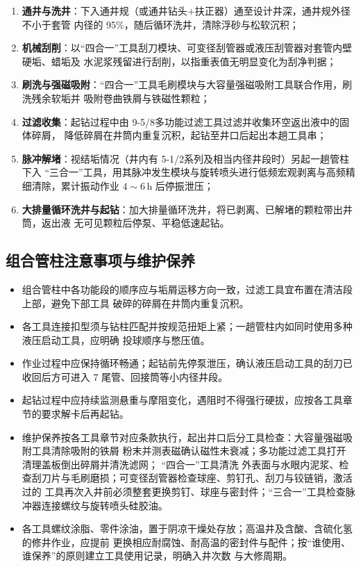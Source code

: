 \begin{enumerate}[label=(\arabic*),leftmargin=2em,itemsep=2pt]
	\item \textbf{通井与洗井}：下入通井规（或通井钻头$+$扶正器）通至设计井深，通井规外径不小于套管
	内径的 95\%，随后循环洗井，清除浮砂与松软沉积；
	\item \textbf{机械刮削}：以“四合一”工具刮刀模块、可变径刮管器或液压刮管器对套管内壁硬垢、蜡垢及
	水泥浆残留进行刮削，以指重表值无明显变化为刮净判据；
	\item \textbf{刷洗与强磁吸附}：“四合一”工具毛刷模块与大容量强磁吸附工具联合作用，刷洗残余软垢并
	吸附卷曲铁屑与铁磁性颗粒；
	\item \textbf{过滤收集}：起钻过程中由 9-5/8\inch 多功能过滤工具过滤并收集环空返出液中的固体碎屑，
	降低碎屑在井筒内重复沉积，起钻至井口后起出本趟工具串；
	\item \textbf{脉冲解堵}：视结垢情况（井内有 5-1/2\inch 系列及相当内径井段时）另起一趟管柱下入
	“三合一”工具，用其脉冲发生模块与旋转喷头进行低频宏观剥离与高频精细清除，累计振动作业
	$4\sim6$\,h 后停振泄压；
	\item \textbf{大排量循环洗井与起钻}：加大排量循环洗井，将已剥离、已解堵的颗粒带出井筒，返出液
	无可见颗粒后停泵、平稳低速起钻。
\end{enumerate}

\subsection{组合管柱注意事项与维护保养}

\begin{itemize}
	\item 组合管柱中各功能段的顺序应与垢屑运移方向一致，过滤工具宜布置在清洁段上部，避免下部工具
	破碎的碎屑在井筒内重复沉积。
	\item 各工具连接扣型须与钻柱匹配并按规范扭矩上紧；一趟管柱内如同时使用多种液压启动工具，应明确
	投球顺序与憋压值。
	\item 作业过程中应保持循环畅通；起钻前先停泵泄压，确认液压启动工具的刮刀已收回后方可进入 7\inch
	尾管、回接筒等小内径井段。
	\item 起钻过程中应持续监测悬重与摩阻变化，遇阻时不得强行硬拔，应按各工具章节的要求解卡后再起钻。
	\item 维护保养按各工具章节对应条款执行，起出井口后分工具检查：大容量强磁吸附工具清除吸附的铁屑
	粉末并测表磁确认磁性未衰减；多功能过滤工具打开清理盖板倒出碎屑并清洗滤网； “四合一”工具清洗
	外表面与水眼内泥浆、检查刮刀片与毛刷磨损；可变径刮管器检查球座、剪钉孔、刮刀与铰链销，激活过的
	工具再次入井前必须整套更换剪钉、球座与密封件；“三合一”工具检查脉冲器连接螺纹与旋转喷头硅胶油。
	\item 各工具螺纹涂脂、零件涂油，置于阴凉干燥处存放；高温井及含酸、含硫化氢的修井作业，应提前
	更换相应耐腐蚀、耐高温的密封件与配件；按“谁使用、谁保养”的原则建立工具使用记录，明确入井次数
	与大修周期。
\end{itemize}

